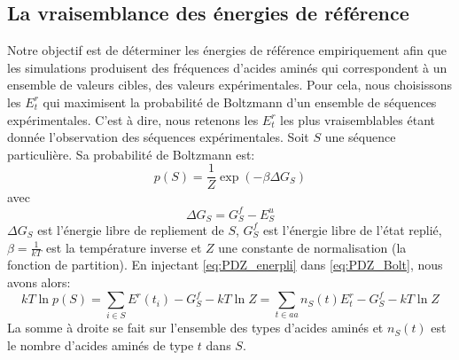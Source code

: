 \subsection{La vraisemblance des énergies de référence}

Notre objectif est de  déterminer les énergies de référence empiriquement afin que les simulations produisent des fréquences d'acides aminés qui correspondent à un ensemble de valeurs cibles, des valeurs expérimentales. Pour cela, nous choisissons les $E_t^r$ qui maximisent la probabilité de Boltzmann d'un ensemble de séquences expérimentales.
C'est à dire, nous retenons les $E_t^r$ les plus vraisemblables étant donnée l'observation des séquences expérimentales. Soit $S$ une séquence particulière. Sa probabilité de Boltzmann est:
\begin{equation}
  \label{eq:PDZ_Bolt}
  p(S)=\frac{1}{Z}\exp(-\beta \Delta G_S)
\end{equation}
avec
\begin{equation}
  \label{eq:PDZ_enerpli}
  \Delta G_S=G_S^f - E^u_S
\end{equation}
$\Delta G_S$ est l'énergie libre de repliement de $S$, $G^f_S$ est l'énergie libre de l'état replié, $\beta =\frac{1}{kT}$ est la température inverse et $Z$ une constante de normalisation (la fonction de partition). En injectant \ref{eq:PDZ_enerpli} dans \ref{eq:PDZ_Bolt}, nous avons alors:
\begin{equation}
kT \ln p(S) = \sum_{i\in S} E^r(t_i) - G^f_S - kT \ln Z = \sum_{t\in aa}n_S(t)E^r_t - G^f_S - kT\ln Z
\end{equation}
La somme à droite se fait sur l'ensemble des types d'acides aminés et $n_S(t)$ est le nombre d'acides aminés de type $t$ dans $S$.

